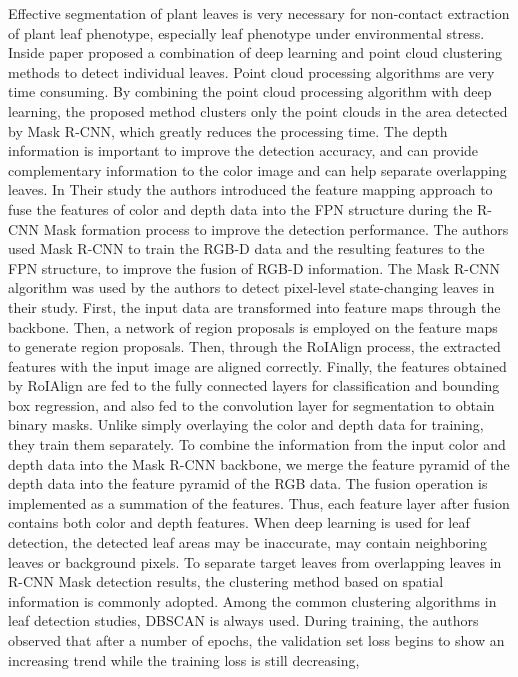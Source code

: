 Effective segmentation of plant leaves is very necessary for non-contact extraction of plant leaf phenotype, especially leaf phenotype under environmental stress.
Inside \cite{LIU2020105753} paper proposed a combination of deep learning and point cloud clustering methods to detect individual leaves. Point cloud processing algorithms are very time
consuming. By combining the point cloud processing algorithm with deep learning, the proposed method clusters only the point clouds in the area detected by Mask R-CNN,
which greatly reduces the processing time. The depth information is important to improve the detection accuracy, and can provide complementary information to the color
image and can help separate overlapping leaves. In Their study the authors introduced the feature mapping approach to fuse the features of color and depth data into the FPN
structure during the R-CNN Mask formation process to improve the detection performance. The authors used Mask R-CNN to train the RGB-D data and the resulting features
to the FPN structure, to improve the fusion of RGB-D information. The Mask R-CNN algorithm was used by the authors to detect pixel-level state-changing leaves in their
study. First, the input data are transformed into feature maps through the backbone. Then, a network of region proposals is employed on the feature maps to generate
region proposals. Then, through the RoIAlign process, the extracted features with the input image are aligned correctly. Finally, the features obtained by RoIAlign are
fed to the fully connected layers for classification and bounding box regression, and also fed to the convolution layer for segmentation to obtain binary masks.
Unlike simply overlaying the color and depth data for training, they train them separately. To combine the information from the input color and depth data into
the Mask R-CNN backbone, we merge the feature pyramid of the depth data into the feature pyramid of the RGB data. The fusion operation is implemented as a summation
of the features. Thus, each feature layer after fusion contains both color and depth features. When deep learning is used for leaf detection, the detected leaf areas
may be inaccurate, may contain neighboring leaves or background pixels. To separate target leaves from overlapping leaves in R-CNN Mask detection results, the clustering
method based on spatial information is commonly adopted. Among the common clustering algorithms in leaf detection studies, DBSCAN is always used.
During training, the authors observed that after a number of epochs, the validation set loss begins to show an increasing trend while the training loss is still decreasing,
